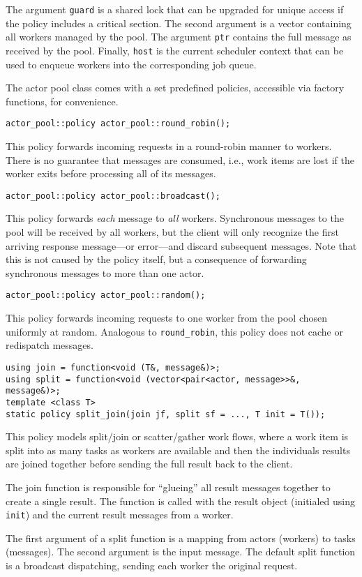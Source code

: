 The argument \lstinline^guard^ is a shared lock that can be upgraded for unique access if the policy includes a critical section. The second argument is a vector containing all workers managed by the pool. The argument \lstinline^ptr^ contains the full message as received by the pool. Finally, \lstinline^host^ is the current scheduler context that can be used to enqueue workers into the corresponding job queue.

The actor pool class comes with a set predefined policies, accessible via factory functions, for convenience.

\begin{lstlisting}
actor_pool::policy actor_pool::round_robin();
\end{lstlisting}

This policy forwards incoming requests in a round-robin manner to workers.
There is no guarantee that messages are consumed, i.e., work items are lost if the worker exits before processing all of its messages.

\begin{lstlisting}
actor_pool::policy actor_pool::broadcast();
\end{lstlisting}

This policy forwards \emph{each} message to \emph{all} workers.
Synchronous messages to the pool will be received by all workers, but the client will only recognize the first arriving response message---or error---and discard subsequent messages.
Note that this is not caused by the policy itself, but a consequence of forwarding synchronous messages to more than one actor.

\begin{lstlisting}
actor_pool::policy actor_pool::random();
\end{lstlisting}

This policy forwards incoming requests to one worker from the pool chosen uniformly at random.
Analogous to \lstinline^round_robin^, this policy does not cache or redispatch messages.

\begin{lstlisting}
using join = function<void (T&, message&)>;
using split = function<void (vector<pair<actor, message>>&, message&)>;
template <class T>
static policy split_join(join jf, split sf = ..., T init = T());
\end{lstlisting}

This policy models split/join or scatter/gather work flows, where a work item is split into as many tasks as workers are available and then the individuals results are joined together before sending the full result back to the client.

The join function is responsible for ``glueing'' all result messages together to create a single result. The function is called with the result object (initialed using \lstinline^init^) and the current result messages from a worker.

The first argument of a split function is a mapping from actors (workers) to tasks (messages). The second argument is the input message. The default split function is a broadcast dispatching, sending each worker the original request.
